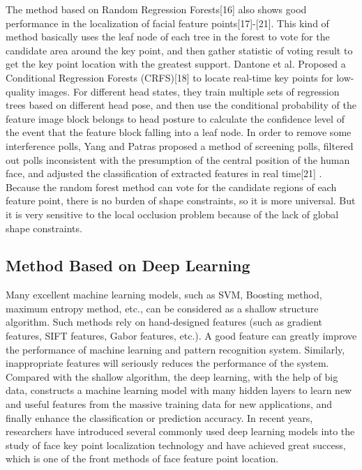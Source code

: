\documentclass{article}
\begin{document}
The method based on Random Regression Forests[16] also shows good performance in the localization of facial feature points[17]-[21]. This kind of method basically uses the leaf node of each tree in the forest to vote for the candidate area around the key point, and then gather statistic of voting result to get the key point location with the greatest support. Dantone et al. Proposed a Conditional Regression Forests (CRFS)[18] to locate real-time key points for low-quality images. For different head states, they train multiple sets of regression trees based on different head pose, and then use the conditional probability of the feature image block belongs to head posture to calculate the confidence level of the event that the feature block falling into a leaf node. In order to remove some interference polls, Yang and Patras proposed a method of screening polls, filtered out polls inconsistent with the presumption of the central position of the human face, and adjusted the classification of extracted features in real time[21] . Because the random forest method can vote for the candidate regions of each feature point, there is no burden of shape constraints, so it is more universal. But it is very sensitive to the local occlusion problem because of the lack of global shape constraints.
\subsection{Method Based on Deep Learning}
Many excellent machine learning models, such as SVM, Boosting method, maximum entropy method, etc., can be considered as a shallow structure algorithm. Such methods rely on hand-designed features (such as gradient features, SIFT features, Gabor features, etc.). A good feature can greatly improve the performance of machine learning and pattern recognition system. Similarly, inappropriate features will seriously reduces the performance of the system. Compared with the shallow algorithm, the deep learning, with the help of big data, constructs a machine learning model with many hidden layers to learn new and useful features from the massive training data for new applications, and finally enhance the classification or prediction accuracy. In recent years, researchers have introduced several commonly used deep learning models into the study of face key point localization technology and have achieved great success, which is one of the front methods of face feature point location.
\end{document}
